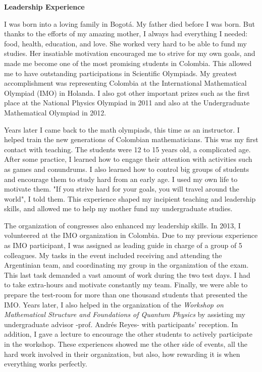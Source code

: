 
{\LARGE \noindent  \textbf{Leadership Experience }}

\vspace{3mm} 

I was born into a loving family in Bogotá. My father died before I was born. But thanks to the efforts of my amazing mother, I always had everything I needed: food, health, education, and love. She worked very hard to be able to fund my studies. Her insatiable motivation encouraged me to strive for my own goals, and made me become one of the most promising students in Colombia. This allowed me to have outstanding participations in Scientific Olympiads. My greatest accomplishment was representing Colombia at the International Mathematical Olympiad (IMO) in Holanda. I also got other important prizes such as the first place at the National Physics Olympiad in 2011 and also at the Undergraduate Mathematical Olympiad in 2012. 

Years later I came back to the math olympiads, this time as an instructor. I helped train the new generations of Colombian mathematicians. This was my first contact with teaching. The students were 12 to 15 years old, a complicated age. After some practice, I learned how to engage their attention with activities such as games and conundrums.  I also learned how to control big groups of students and encourage them to study hard from an early age. I used my own life to motivate them. "If you strive hard for your goals, you will travel around the world", I told them. This experience shaped my incipient teaching and leadership skills, and allowed me to help my mother fund my undergraduate studies. 

The organization of congresses also enhanced my leadership skills. In 2013, I volunteered at the IMO organization in Colombia. Due to my previous experience as IMO participant, I was assigned as  leading guide in charge of a group of 5 colleagues. My tasks in the event included receiving and attending the Argentinian team, and coordinating my group in the organization of the exam. This last task demanded a vast amount of work during the two test days. I had to take extra-hours and motivate constantly my team. Finally, we were able to prepare the test-room for more than one thousand students that presented the IMO.  Years later, I also helped in the organization of the  \textit{Workshop on Mathematical Structure and Foundations of Quantum Physics} by assisting my undergraduate advisor -prof. Andrés Reyes-  with participants’ reception. In addition, I gave a lecture to encourage the other students to actively participate in the workshop. These experiences showed me the other side of events, all the hard work involved in their organization, but also, how rewarding it is when everything works perfectly. 
	 
